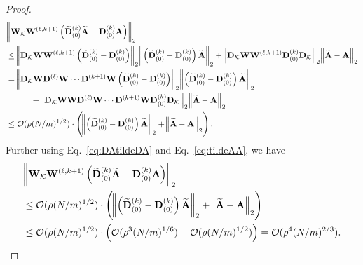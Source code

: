 \begin{proof}
	\begingroup \allowdisplaybreaks
	\begin{align*}
		&\norm{\mathbf{W}_{\mathcal{K}} \mathbf{W}^{(\ell, k+1)} \left(\widetilde{\mathbf{D}}_{(0)}^{(k)} \widetilde{\mathbf{A}} - \mathbf{D}_{(0)}^{(k)} \mathbf{A}\right)}_2 \\& 
		\le \norm{\mathbf{D}_{\mathcal{K}} \mathbf{W} \mathbf{W}^{(\ell, k+1)} \left(\widetilde{\mathbf{D}}_{(0)}^{(k)}  -  \mathbf{D}_{(0)}^{(k)}  \right)}_2 \norm{\left(\widetilde{\mathbf{D}}_{(0)}^{(k)}  -  \mathbf{D}_{(0)}^{(k)}  \right)\widetilde{\mathbf{A}}}_2 + \norm{\mathbf{D}_{\mathcal{K}} \mathbf{W} \mathbf{W}^{(\ell, k+1)} \mathbf{D}_{(0)}^{(k)} \mathbf{D}_{\mathcal{K}}}_2 \norm{ \widetilde{\mathbf{A}} -  \mathbf{A} }_2 \\&
		= \norm{\mathbf{D}_{\mathcal{K}} \mathbf{W} \mathbf{D}^{(\ell)} \mathbf{W} \cdots \mathbf{D}^{(k+1)} \mathbf{W} \left(\widetilde{\mathbf{D}}_{(0)}^{(k)}  -  \mathbf{D}_{(0)}^{(k)}  \right)}_2 \norm{\left(\widetilde{\mathbf{D}}_{(0)}^{(k)}  -  \mathbf{D}_{(0)}^{(k)}  \right)\widetilde{\mathbf{A}}}_2 \\& \quad \quad \quad + \norm{\mathbf{D}_{\mathcal{K}} \mathbf{W} \mathbf{W} \mathbf{D}^{(\ell)} \mathbf{W} \cdots \mathbf{D}^{(k+1)} \mathbf{W} \mathbf{D}_{(0)}^{(k)} \mathbf{D}_{\mathcal{K}}}_2 \norm{ \widetilde{\mathbf{A}} -  \mathbf{A} }_2
		\\&
		\le \mathcal{O}(\rho (N/m)^{1/2}) \cdot\left( \norm{\left(\widetilde{\mathbf{D}}_{(0)}^{(k)}  -  \mathbf{D}_{(0)}^{(k)}  \right)\widetilde{\mathbf{A}}}_2 + \norm{ \widetilde{\mathbf{A}} -  \mathbf{A} }_2\right).
	\end{align*}
	\endgroup
	Further using Eq.~\ref{eq:DAtildeDA} and Eq.~\ref{eq:tildeAA}, we have
	\begingroup \allowdisplaybreaks
	\begin{align*}
		&\norm{\mathbf{W}_{\mathcal{K}} \mathbf{W}^{(\ell, k+1)} \left(\widetilde{\mathbf{D}}_{(0)}^{(k)} \widetilde{\mathbf{A}} - \mathbf{D}_{(0)}^{(k)} \mathbf{A}\right)}_2 \\& 
		\le \mathcal{O}(\rho (N/m)^{1/2}) \cdot\left( \norm{\left(\widetilde{\mathbf{D}}_{(0)}^{(k)}  -  \mathbf{D}_{(0)}^{(k)}  \right)\widetilde{\mathbf{A}}}_2 + \norm{ \widetilde{\mathbf{A}} -  \mathbf{A} }_2\right) \\&
		\le \mathcal{O}(\rho (N/m)^{1/2}) \cdot\left( \mathcal{O}(\rho^3 (N/m)^{1/6})  +  \mathcal{O}(\rho (N/m)^{1/2})\right) = \mathcal{O}(\rho^4 (N/m)^{2/3}).
	\end{align*}
	\endgroup

\end{proof}
